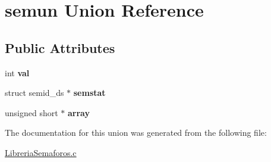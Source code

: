 \hypertarget{unionsemun}{}\section{semun Union Reference}
\label{unionsemun}
\subsection*{Public Attributes}
\begin{DoxyCompactItemize}
\item 
int {\bfseries val}\hypertarget{unionsemun_ac6121ecb6d04a024e07e12bd71b94031}{}\label{unionsemun_ac6121ecb6d04a024e07e12bd71b94031}

\item 
struct semid\+\_\+ds $\ast$ {\bfseries semstat}\hypertarget{unionsemun_afb976847aea44952be2118ad0329d832}{}\label{unionsemun_afb976847aea44952be2118ad0329d832}

\item 
unsigned short $\ast$ {\bfseries array}\hypertarget{unionsemun_aca23b8e730a0553205813c0cb7692b54}{}\label{unionsemun_aca23b8e730a0553205813c0cb7692b54}

\end{DoxyCompactItemize}


The documentation for this union was generated from the following file\+:\begin{DoxyCompactItemize}
\item 
\hyperlink{LibreriaSemaforos_8c}{Libreria\+Semaforos.\+c}\end{DoxyCompactItemize}
